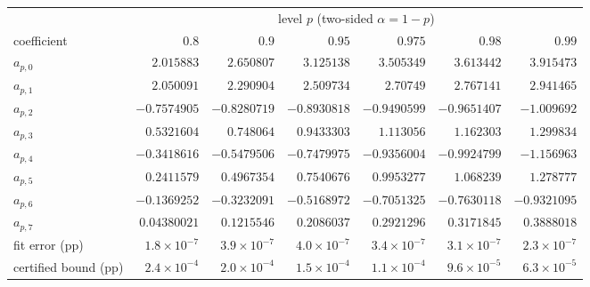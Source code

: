 \begin{tabular}{@{}lrrrrrr@{}}\toprule
& \multicolumn{6}{c}{level $p$ (two-sided $\alpha=1-p$)}\\\cmidrule(l){2-7}
coefficient & $0.8$ & $0.9$ & $0.95$ & $0.975$ & $0.98$ & $0.99$\\\midrule
$a_{p,0}$ & $2.015883$ & $2.650807$ & $3.125138$ & $3.505349$ & $3.613442$ & $3.915473$\\
$a_{p,1}$ & $2.050091$ & $2.290904$ & $2.509734$ & $2.70749$ & $2.767141$ & $2.941465$\\
$a_{p,2}$ & $-0.7574905$ & $-0.8280719$ & $-0.8930818$ & $-0.9490599$ & $-0.9651407$ & $-1.009692$\\
$a_{p,3}$ & $0.5321604$ & $0.748064$ & $0.9433303$ & $1.113056$ & $1.162303$ & $1.299834$\\
$a_{p,4}$ & $-0.3418616$ & $-0.5479506$ & $-0.7479975$ & $-0.9356004$ & $-0.9924799$ & $-1.156963$\\
$a_{p,5}$ & $0.2411579$ & $0.4967354$ & $0.7540676$ & $0.9953277$ & $1.068239$ & $1.278777$\\
$a_{p,6}$ & $-0.1369252$ & $-0.3232091$ & $-0.5168972$ & $-0.7051325$ & $-0.7630118$ & $-0.9321095$\\
$a_{p,7}$ & $0.04380021$ & $0.1215546$ & $0.2086037$ & $0.2921296$ & $0.3171845$ & $0.3888018$\\
\midrule fit error (pp) & $1.8\times10^{-7}$ & $3.9\times10^{-7}$ & $4.0\times10^{-7}$ & $3.4\times10^{-7}$ & $3.1\times10^{-7}$ & $2.3\times10^{-7}$\\
certified bound (pp) & $2.4\times10^{-4}$ & $2.0\times10^{-4}$ & $1.5\times10^{-4}$ & $1.1\times10^{-4}$ & $9.6\times10^{-5}$ & $6.3\times10^{-5}$\\
\bottomrule\end{tabular}
